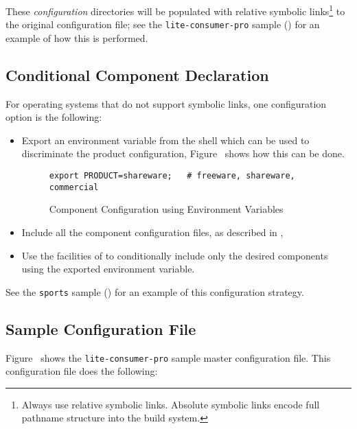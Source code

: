 These \emph{configuration} directories will be populated with relative
symbolic links\footnote{Always use relative symbolic links.  Absolute symbolic links
  encode full pathname structure into the build system.} to the
original configuration file; see the \texttt{lite-consumer-pro} sample
() for an example of how this is
performed.

\subsection{Conditional Component Declaration}

For operating systems that do not support symbolic links, one
configuration option is the following:

\begin{itemize}
\item Export an environment variable from the shell which can be used
  to discriminate the product configuration,
  Figure~
  shows how this can be done.

\begin{figure}[b]
\hrulefill
\begin{verbatim}
export PRODUCT=shareware;   # freeware, shareware, commercial
\end{verbatim}
\hrulefill
\caption{Component Configuration using Environment Variables}
\label{wrapping:configuration-using-environment-variables}
\label{usinglmsbw:sourcedir-verb}
\end{figure}

\item Include all the component configuration files, as described in
  ,
\item Use the facilities of \gnumake to conditionally include only the
  desired components using the exported environment variable.
\end{itemize}

See the \texttt{sports} sample () for an example
of this configuration strategy.

\subsection{Sample Configuration File}
Figure~ shows the
\texttt{lite-consumer-pro} sample master configuration file.  This
configuration file does the following:

